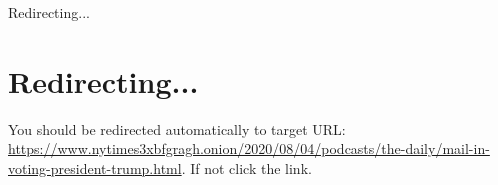 Redirecting...

\hypertarget{redirecting}{%
\section{Redirecting...}\label{redirecting}}

You should be redirected automatically to target URL:
\url{https://www.nytimes3xbfgragh.onion/2020/08/04/podcasts/the-daily/mail-in-voting-president-trump.html}.
If not click the link.
